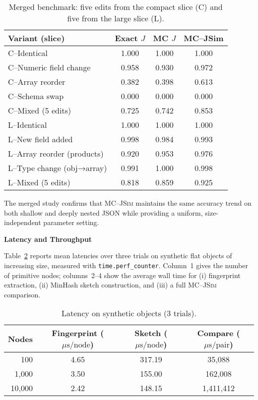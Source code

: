 \documentclass[sigconf]{acmart}
\begin{document}
\begin{table}[t]
\centering
\caption{Merged benchmark: five edits from the compact slice (C) and five from
         the large slice (L).}
\label{tab:merged}
\begin{tabular}{@{}lccc@{}}
\toprule
Variant (slice)                & Exact $J$ & MC $J$ & MC--JSim \\ \midrule
C–Identical                    & 1.000 & 1.000 & 1.000 \\
C–Numeric field change         & 0.958 & 0.930 & 0.972 \\
C–Array reorder                & 0.382 & 0.398 & 0.613 \\
C–Schema swap                  & 0.000 & 0.000 & 0.000 \\
C–Mixed (5 edits)              & 0.725 & 0.742 & 0.853 \\
\midrule
L–Identical                    & 1.000 & 1.000 & 1.000 \\
L–New field added              & 0.998 & 0.984 & 0.993 \\
L–Array reorder (products)     & 0.920 & 0.953 & 0.976 \\
L–Type change (obj→array)      & 0.991 & 1.000 & 0.998 \\
L–Mixed (5 edits)              & 0.818 & 0.859 & 0.925 \\
\bottomrule
\end{tabular}
\end{table}

The merged study confirms that \textsc{MC--JSim} maintains the same
accuracy trend on both shallow and deeply nested JSON while providing a
uniform, size-independent parameter setting.

\bigskip
\noindent\textbf{Latency and Throughput}

Table~\ref{tab:latency} reports mean latencies over three trials on
synthetic flat objects of increasing size, measured with
\texttt{time.perf\_counter}.  Column~1 gives the number of primitive
nodes; columns~2–4 show the average wall time for (i) fingerprint extraction,  
(ii) MinHash sketch construction, and  
(iii) a full \textsc{MC--JSim} comparison.  

\begin{table}[t]
\centering
\caption{Latency on synthetic objects (3 trials).}
\label{tab:latency}
\begin{tabular}{@{}rccc@{}}
\toprule
Nodes &
Fingerprint (\(\mu\mathrm{s}/\mathrm{node}\)) &
Sketch (\(\mu\mathrm{s}/\mathrm{node}\)) &
Compare (\(\mu\mathrm{s}/\mathrm{pair}\)) \\
\midrule
   100   & 4.65  & 317.19   & 35{,}088 \\
 1{,}000 & 3.50  & 155.00   & 162{,}008 \\
10{,}000 & 2.42  & 148.15   &1{,}411{,}412\\
\bottomrule
\end{tabular}
\end{table}
\end{document}
